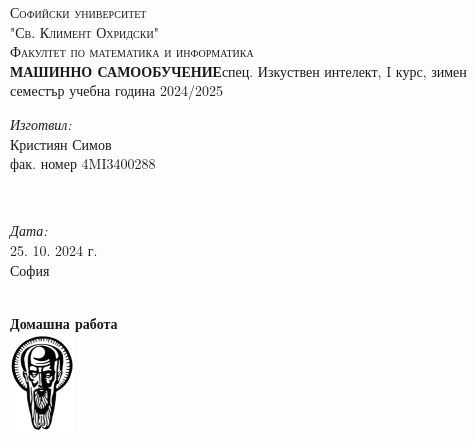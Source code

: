 \documentclass[12pt]{article}
\begin{document}
	\begin{titlepage}	
		\newcommand{\HRule}{\rule{\linewidth}{0.5mm}} %
		\begin{center}
		\textsc{\LARGE Софийски университет }\\[0.3cm]
		\textsc{\LARGE "Св. Климент Охридски" }\\[0.3cm]
		\textsc{\Large Факултет по математика и информатика }\\[0.2cm]
		
		{\fontsize{12}{18}\selectfont \bf МАШИННО САМООБУЧЕНИЕ}\vspace{15pt}\newline спец. Изкуствен интелект, I курс, зимен семестър \newline учебна година 2024/2025
		\vspace{30pt}
		
		
		
		
		
		\begin{minipage}{0.4\textwidth}
			\begin{flushleft}\large
				\emph{Изготвил:} \\
				Кристиян Симов \\ 
				фак. номер 4MI3400288
			\end{flushleft}
		\end{minipage}
		~
		\begin{minipage}{0.4\textwidth}
			\begin{flushright}
				\large
				\emph{Дата:}\\
				25. 10. 2024 г. %
				\\София 
			\end{flushright}
		\end{minipage}\\[1cm]
		\bigskip
		{\large \textbf{Домашна работа }}\\[1cm] %
		\includegraphics{logo_su_no_text.png}\\[1cm]
		\vfill %
		\end{center}
	\end{titlepage}
	
\end{document}

